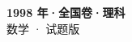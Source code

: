 \documentclass[zihao=-4, a4paper]{ctexart}
\begin{document}
\begin{center}
  {\Large\bfseries 1998 年·全国卷·理科}\\[4pt]
  {\large 数学 · 试题版}
\end{center}
\medskip
{}

\end{document}
